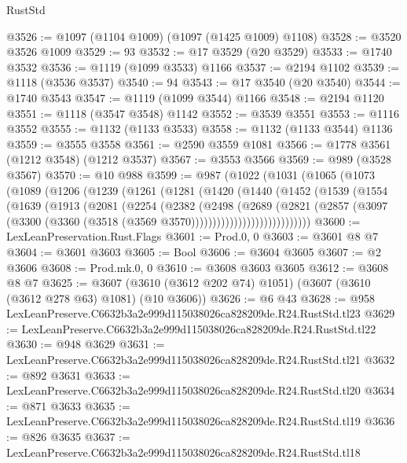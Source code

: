 \begin{lexlean}{RustStd}
\begin{coremodule}
@3526 := @1097 (@1104 @1009) (@1097 (@1425 @1009) @1108)
@3528 := @3520 @3526 @1009
@3529 := 93
@3532 := @17 @3529 (@20 @3529)
@3533 := @1740 @3532
@3536 := @1119 (@1099 @3533) @1166
@3537 := @2194 @1102
@3539 := @1118 (@3536 @3537)
@3540 := 94
@3543 := @17 @3540 (@20 @3540)
@3544 := @1740 @3543
@3547 := @1119 (@1099 @3544) @1166
@3548 := @2194 @1120
@3551 := @1118 (@3547 @3548) @1142
@3552 := @3539 @3551
@3553 := @1116 @3552
@3555 := @1132 (@1133 @3533)
@3558 := @1132 (@1133 @3544) @1136
@3559 := @3555 @3558
@3561 := @2590 @3559 @1081
@3566 := @1778 @3561 (@1212 @3548) (@1212 @3537)
@3567 := @3553 @3566
@3569 := @989 (@3528 @3567)
@3570 := @10 @988
@3599 := @987
    (@1022
      (@1031
        (@1065
          (@1073
            (@1089
              (@1206
                (@1239
                  (@1261
                    (@1281
                      (@1420
                        (@1440
                          (@1452
                            (@1539
                              (@1554
                                (@1639
                                  (@1913
                                    (@2081
                                      (@2254
                                        (@2382
                                          (@2498
                                            (@2689
                                              (@2821
                                                (@2857
                                                  (@3097
                                                    (@3300
                                                      (@3360
                                                        (@3518
                                                          (@3569 @3570))))))))))))))))))))))))))))
@3600 := LexLeanPreservation.Rust.Flags
@3601 := Prod.{0, 0}
@3603 := @3601 @8 @7
@3604 := @3601 @3603
@3605 := Bool
@3606 := @3604 @3605
@3607 := @2 @3606
@3608 := Prod.mk.{0, 0}
@3610 := @3608 @3603 @3605
@3612 := @3608 @8 @7
@3625 := @3607 (@3610 (@3612 @202 @74) @1051) (@3607 (@3610 (@3612 @278 @63) @1081) (@10 @3606))
@3626 := @6 @43
@3628 := @958 LexLeanPreserve.C6632b3a2e999d115038026ca828209de.R24.RustStd.tl23
@3629 := LexLeanPreserve.C6632b3a2e999d115038026ca828209de.R24.RustStd.tl22
@3630 := @948 @3629
@3631 := LexLeanPreserve.C6632b3a2e999d115038026ca828209de.R24.RustStd.tl21
@3632 := @892 @3631
@3633 := LexLeanPreserve.C6632b3a2e999d115038026ca828209de.R24.RustStd.tl20
@3634 := @871 @3633
@3635 := LexLeanPreserve.C6632b3a2e999d115038026ca828209de.R24.RustStd.tl19
@3636 := @826 @3635
@3637 := LexLeanPreserve.C6632b3a2e999d115038026ca828209de.R24.RustStd.tl18

\end{coremodule}
\end{lexlean}
